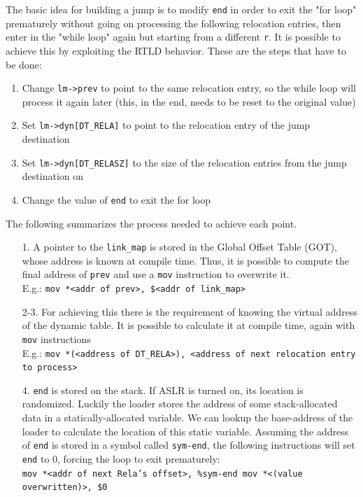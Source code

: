 \documentclass[11pt,twoside,a4paper]{article}
\begin{document}
The basic idea for building a jump is to modify \texttt{end} in order to exit the "for loop" prematurely without going on processing the following relocation entries, then enter in the "while loop" again but starting from a different \texttt{r}.
It is possible to achieve this by exploiting the RTLD behavior. These are the steps that have to be done:

\begin{enumerate}
\item Change \texttt{lm->prev} to point to the same relocation entry, so the while loop will process it again later (this, in the end, needs to be reset to the original value)
\item Set \texttt{lm->dyn[DT\_RELA]} to point to the relocation entry of the jump destination
\item Set \texttt{lm->dyn[DT\_RELASZ]} to the size of the relocation entries from the jump destination on
\item Change the value of \texttt{end} to exit the for loop
\end{enumerate}


The following summarizes the process needed to achieve each point.

\begin{itemize}
  \item[1.] A pointer to the \texttt{link\_map} is stored in the Global Offset Table (GOT), whose address is known at compile time. Thus, it is possible to compute the final address of \texttt{prev} and use a \texttt{mov} instruction to overwrite it. \\ E.g.: \texttt{mov *<addr of prev>, \$<addr of link\_map>}
  \item[2-3.] For achieving this there is the requirement of knowing the virtual address of the dynamic table. It is possible to calculate it at compile time, again with \texttt{mov} instructions \\ E.g.: \texttt{mov *(<address of DT\_RELA>), <address of next relocation entry to process>}
  \item[4.] \texttt{end} is stored on the stack. If ASLR is turned on, its location is randomized. Luckily the loader stores the address of some stack-allocated data in a statically-allocated variable. We can lookup the base-address of the loader to calculate the location of this static variable. Assuming the
address of \texttt{end} is stored in a symbol called \texttt{sym-end}, the following instructions will set \texttt{end} to 0, forcing the loop to exit prematurely: \\
 \texttt{mov *<addr of next Rela's offset>, \%sym-end mov *<(value overwritten)>, \$0}
\end{itemize}
\end{document}
